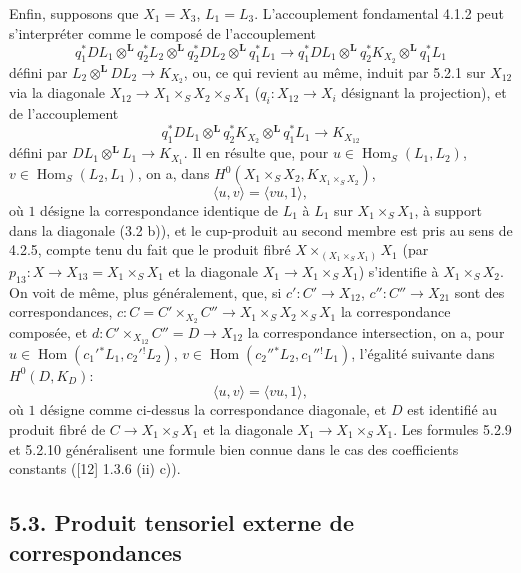 \documentclass[11pt]{article}
\DeclareMathOperator{\Hom}{Hom}
\providecommand{\Hom}{\operatorname{Hom}}
\providecommand{\Hom}{\operatorname{Hom}}
\begin{document}
Enfin, supposons que $X_1=X_3$, $L_1=L_3$. L'accouplement fondamental 4.1.2 peut s'interpréter comme le composé de l'accouplement
\begin{equation}
\tag{5.2.7}
q_1^*DL_1\otimes^{\mathbf L}q_2^*L_2\otimes^{\mathbf L}q_2^*DL_2\otimes^{\mathbf L}q_1^*L_1
\longrightarrow
q_1^*DL_1\otimes^{\mathbf L}q_2^*K_{X_2}\otimes^{\mathbf L}q_1^*L_1
\end{equation}
défini par $L_2\otimes^{\mathbf L}DL_2\to K_{X_2}$, ou, ce qui revient au même, induit par 5.2.1 sur $X_{12}$ via la diagonale $X_{12}\to X_1\times_SX_2\times_SX_1$ ($q_i:X_{12}\to X_i$ désignant la projection), et de l'accouplement
\begin{equation}
\tag{5.2.8}
q_1^*DL_1\otimes^{\mathbf L}q_2^*K_{X_2}\otimes^{\mathbf L}q_1^*L_1\longrightarrow K_{X_{12}}
\end{equation}
défini par $DL_1\otimes^{\mathbf L}L_1\to K_{X_1}$. Il en résulte que, pour $u\in\Hom_S(L_1,L_2)$, $v\in\Hom_S(L_2,L_1)$, on a, dans $H^0(X_1\times_SX_2,K_{X_1\times_SX_2})$,
\begin{equation}
\tag{5.2.9}
\langle u,v\rangle=\langle vu,1\rangle,
\end{equation}
où $1$ désigne la correspondance identique de $L_1$ à $L_1$ sur $X_1\times_SX_1$, à support dans la diagonale (3.2 b)), et le cup-produit au second membre est pris au sens de 4.2.5, compte tenu du fait que le produit fibré $X\times_{(X_1\times_SX_1)}X_1$ (par $p_{13}:X\to X_{13}=X_1\times_SX_1$ et la diagonale $X_1\to X_1\times_SX_1$) s'identifie à $X_1\times_SX_2$. On voit de même, plus généralement, que, si $c':C'\to X_{12}$, $c'':C''\to X_{21}$ sont des correspondances, $c:C=C'\times_{X_2}C''\to X_1\times_SX_2\times_SX_1$ la correspondance composée, et $d:C'\times_{X_{12}}C''=D\to X_{12}$ la correspondance intersection, on a, pour $u\in\Hom(c_1'{}^*L_1,c_2'{}^!L_2)$, $v\in\Hom(c_2''{}^*L_2,c_1''{}^!L_1)$, l'égalité suivante dans $H^0(D,K_D)$:
\begin{equation}
\tag{5.2.10}
\langle u,v\rangle=\langle vu,1\rangle,
\end{equation}
où $1$ désigne comme ci-dessus la correspondance diagonale, et $D$ est identifié au produit fibré de $C\to X_1\times_SX_1$ et la diagonale $X_1\to X_1\times_SX_1$. Les formules 5.2.9 et 5.2.10 généralisent une formule bien connue dans le cas des coefficients constants ([12] 1.3.6 (ii) c)).

\subsection*{5.3. Produit tensoriel externe de correspondances}
\end{document}
